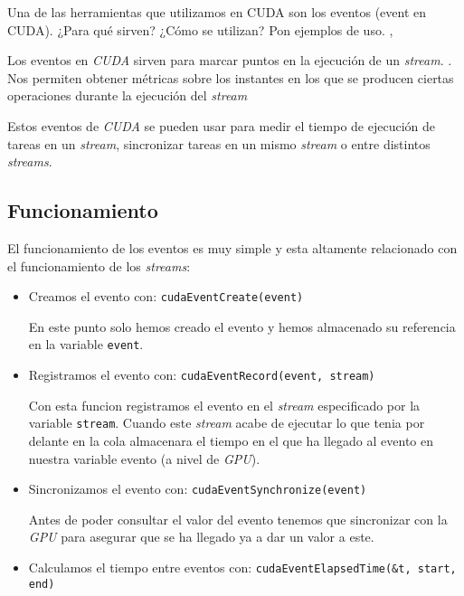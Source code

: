 \begin{pregunta}{Una de las herramientas que utilizamos en CUDA son los eventos (event en
CUDA). ¿Para qué sirven? ¿Cómo se utilizan? Pon ejemplos de uso.} \sep{}

Los eventos en \emph{CUDA} sirven para marcar puntos en la ejecución de un \emph{stream}.
\cite{noauthor_event_nodate}. Nos permiten obtener métricas sobre los instantes en los
que se producen ciertas operaciones durante la ejecución del \emph{stream}

Estos eventos de \emph{CUDA} se pueden usar para medir el tiempo de ejecución
de tareas en un \emph{stream}, sincronizar tareas en un mismo \emph{stream} o
entre distintos \emph{streams}.

\subsection*{Funcionamiento}

El funcionamiento de los eventos es muy simple y esta altamente relacionado con
el funcionamiento de los \emph{streams}:

\begin{itemize}
    \item Creamos el evento con: \texttt{cudaEventCreate(event)}

        En este punto solo hemos creado el evento y hemos almacenado su
        referencia en la variable \texttt{event}.

    \item Registramos el evento con: \texttt{cudaEventRecord(event, stream)}

        Con esta funcion registramos el evento en el \emph{stream} especificado
        por la variable \texttt{stream}. Cuando este \emph{stream} acabe de
        ejecutar lo que tenia por delante en la cola almacenara el tiempo en el
        que ha llegado al evento en nuestra variable evento (a nivel de
        \emph{GPU}).

    \item Sincronizamos el evento con: \texttt{cudaEventSynchronize(event)}

        Antes de poder consultar el valor del evento tenemos que sincronizar con
        la \emph{GPU} para asegurar que se ha llegado ya a dar un valor a este.

    \item Calculamos el tiempo entre eventos con: \texttt{cudaEventElapsedTime(&t, start, end)}


\end{itemize}
\end{pregunta}

